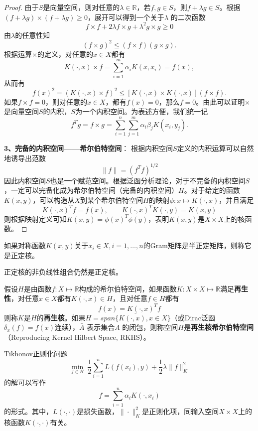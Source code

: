\begin{proof}
由于$S$是向量空间，则对任意的$\lambda\in \mathbb{R}$，若$f,g\in S$，则$f + \lambda g\in S$。根据$(f + \lambda g) \times (f + \lambda g) \ge 0$，展开可以得到一个关于$\lambda$ 的二次函数
\[
  f\times f + 2\lambda f\times g + \lambda^2 g\times g \ge 0
\]
由$\lambda$的任意性知
\[(f\times g)^2 \le (f\times f)(g\times g).\]
根据运算$\times$的定义，对任意的$x\in X$都有
\[K(\cdot,x) \times f = \sum\limits_{i=1}^m \alpha_i K(x,x_i) = f(x),\]
从而有
\[f(x)^2 = (K(\cdot,x) \times f)^2 \le [K(\cdot,x) \times K(\cdot,x)](f\times f).\]
如果$f\times f = 0$，则对任意的$x\in X$，都有$f(x)=0$，那么$f=0$。由此可以证明$\times$是向量空间$S$的内积，$S$为一个内积空间。为表述方便，我们统一记
\[f^T g=f\times g = \sum\limits_{i=1}^n \sum\limits_{j=1}^m \alpha_i \beta_j K(x_i,y_j).\]

\noindent \textbf{3、完备的内积空间——希尔伯特空间}：
根据内积空间$S$定义的内积运算可以自然地诱导出范数
\[
    \|f\| = (f^T f)^{1/2}
\]
因此内积空间$S$也是一个赋范空间。根据泛函分析理论，对于不完备的内积空间$S$，一定可以完备化成为希尔伯特空间（完备的内积空间）$H$。对于给定的函数$K(x,y)$，可以构造从$X$到某个希尔伯特空间$H$的映射$\phi:x\mapsto K(\cdot,x)$，并且满足
\[
    K(\cdot,x)^T f=f(x),\qquad K(\cdot,x)^T K(\cdot,y) = K(x,y)
\]
则根据映射定义可知$K(x,y)=\phi(x)^T \phi(y)$，表明$K(x,y)$是$X\times X$上的核函数。
\end{proof}

\begin{definition}[正定核]
如果对称函数$K(x,y)$关于$x_i\in X,i=1,\ldots,n$的Gram矩阵是半正定矩阵，则称它是正定核。
\end{definition}

\begin{corollary}
正定核的非负线性组合仍然是正定核。
\end{corollary}

\begin{definition}[再生核希尔伯特空间]
假设$H$是由函数$f:X\mapsto \mathbb{R}$构成的希尔伯特空间，如果函数$K: X\times X \mapsto \mathbb R$满足\textbf{再生性}，对任意$x\in X$都有$K(\cdot,x)\in H$，且对任意$f\in H$都有
\begin{equation}
    f(x) = K(\cdot,x)^T f
\end{equation}
则称$K$是$H$的\textbf{再生核}。如果$H=\overline{span\{K(\cdot,x),x\in X\}}$（或Dirac泛函$\delta_x(f)=f(x)$连续），$\bar A$ 表示集合$A$ 的闭包，则称空间$H$是\textbf{再生核希尔伯特空间}（Reproducing Kernel Hilbert Space, RKHS）。
\end{definition}

\begin{theorem}[表示定理]
Tikhonov正则化问题
\begin{equation}
    \min\limits_{f\in H}~\frac{1}{2} \sum\limits_{i=1}^n L(f(x_i),y) + \frac{1}{2} \lambda\|f\|_K^2
\end{equation}
的解可以写作
\begin{equation}
    f = \sum\limits_{i=1}^n \alpha_i K(\cdot,x_i)
\end{equation}
的形式。其中，$L(\cdot,\cdot)$是损失函数，$\|\cdot\|_K^2$是正则化项，同输入空间$X\times X$上的核函数$K(\cdot,\cdot)$有关。
\end{theorem}


